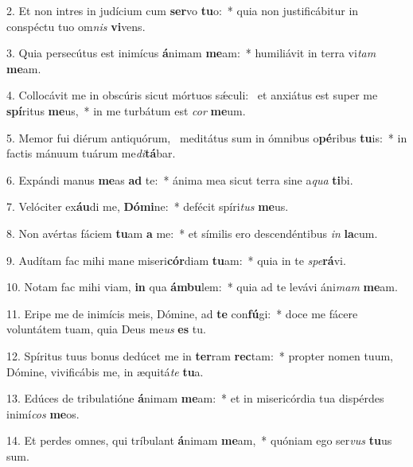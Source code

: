 2. Et non intres in judícium cum \textbf{ser}vo \textbf{tu}o:~*  quia non justificábitur in conspéctu tuo om\textit{nis} \textbf{vi}vens.\

3. Quia persecútus est inimícus \textbf{á}nimam \textbf{me}am:~*  humiliávit in terra vi\textit{tam} \textbf{me}am.\

4. Collocávit me in obscúris sicut mórtuos sǽculi: \dag\  et anxiátus est super me \textbf{spí}ritus \textbf{me}us,~*  in me turbátum est \textit{cor} \textbf{me}um.\

5. Memor fui diérum antiquórum, \dag\  meditátus sum in ómnibus o\textbf{pé}ribus \textbf{tu}is:~*  in factis mánuum tuárum me\textit{di}\textbf{tá}bar.\

6. Expándi manus \textbf{me}as \textbf{ad} te:~*  ánima mea sicut terra sine a\textit{qua} \textbf{ti}bi.\

7. Velóciter ex\textbf{áu}di me, \textbf{Dó}\textbf{mi}ne:~*  defécit spíri\textit{tus} \textbf{me}us.\

8. Non avértas fáciem \textbf{tu}am \textbf{a} me:~*  et símilis ero descendéntibus \textit{in} \textbf{la}cum.\

9. Audítam fac mihi mane miseri\textbf{cór}diam \textbf{tu}am:~*  quia in te \textit{spe}\textbf{rá}vi.\

10. Notam fac mihi viam, \textbf{in} qua \textbf{ám}\textbf{bu}lem:~*  quia ad te levávi áni\textit{mam} \textbf{me}am.\

11. Eripe me de inimícis meis, Dómine, ad \textbf{te} con\textbf{fú}gi:~*  doce me fácere voluntátem tuam, quia Deus me\textit{us} \textbf{es} tu.\

12. Spíritus tuus bonus dedúcet me in \textbf{ter}ram \textbf{rec}tam:~*  propter nomen tuum, Dómine, vivificábis me, in æquitá\textit{te} \textbf{tu}a.\

13. Edúces de tribulatióne \textbf{á}nimam \textbf{me}am:~*  et in misericórdia tua dispérdes inimí\textit{cos} \textbf{me}os.\

14. Et perdes omnes, qui tríbulant \textbf{á}nimam \textbf{me}am,~*  quóniam ego ser\textit{vus} \textbf{tu}us sum.\

